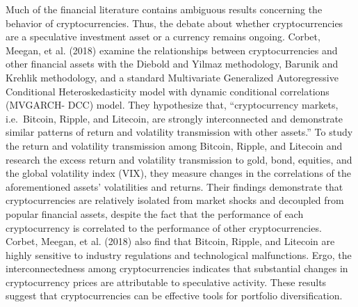 \documentclass[]{article}
\begin{document}
Much of the financial literature contains ambiguous results concerning
the behavior of cryptocurrencies. Thus, the debate about whether
cryptocurrencies are a speculative investment asset or a currency
remains ongoing. Corbet, Meegan, et al. (2018) examine the relationships
between cryptocurrencies and other financial assets with the Diebold and
Yilmaz methodology, Barunik and Krehlik methodology, and a standard
Multivariate Generalized Autoregressive Conditional Heteroskedasticity
model with dynamic conditional correlations (MVGARCH- DCC) model. They
hypothesize that, ``cryptocurrency markets, i.e.~Bitcoin, Ripple, and
Litecoin, are strongly interconnected and demonstrate similar patterns
of return and volatility transmission with other assets.'' To study the
return and volatility transmission among Bitcoin, Ripple, and Litecoin
and research the excess return and volatility transmission to gold,
bond, equities, and the global volatility index (VIX), they measure
changes in the correlations of the aforementioned assets' volatilities
and returns. Their findings demonstrate that cryptocurrencies are
relatively isolated from market shocks and decoupled from popular
financial assets, despite the fact that the performance of each
cryptocurrency is correlated to the performance of other
cryptocurrencies. Corbet, Meegan, et al. (2018) also find that Bitcoin,
Ripple, and Litecoin are highly sensitive to industry regulations and
technological malfunctions. Ergo, the interconnectedness among
cryptocurrencies indicates that substantial changes in cryptocurrency
prices are attributable to speculative activity. These results suggest
that cryptocurrencies can be effective tools for portfolio
diversification.
\end{document}
